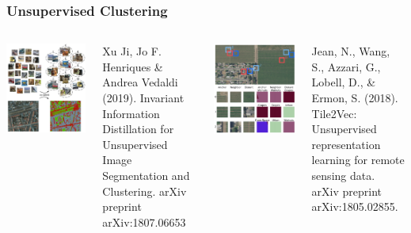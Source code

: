 \begin{frame}
\frametitle{Unsupervised Clustering}

\begin{columns}
\includegraphics[width=.5\textwidth]{images/IIC_clustering}

{\small Xu Ji, Jo F. Henriques \& Andrea Vedaldi (2019). Invariant Information Distillation for Unsupervised Image Segmentation and Clustering. arXiv preprint arXiv:1807.06653}

\includegraphics[width=.5\textwidth]{images/jean19_results}

{\small Jean, N., Wang, S., Azzari, G., Lobell, D., \& Ermon, S. (2018). Tile2Vec: Unsupervised representation learning for remote sensing data. arXiv preprint arXiv:1805.02855.}


\end{columns}


\end{frame}
%
%	
%
%		
%
%		
%
%
